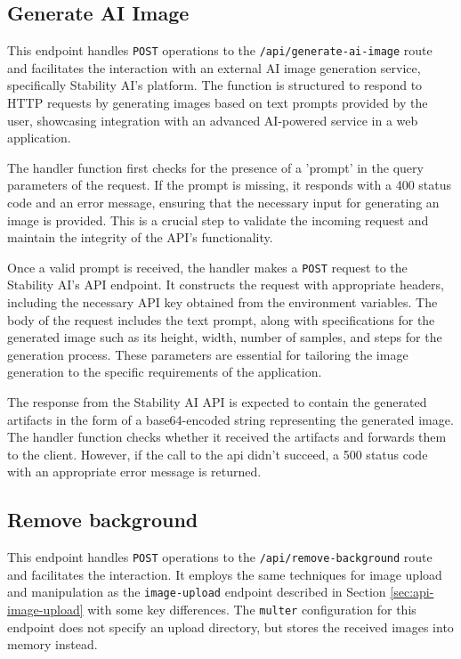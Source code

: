 \subsection{Generate AI Image}

This endpoint handles \texttt{POST} operations to the \texttt{/api/generate-ai-image} route and facilitates the interaction with an external AI image generation service, specifically Stability AI's platform. The function is structured to respond to HTTP requests by generating images based on text prompts provided by the user, showcasing integration with an advanced AI-powered service in a web application.

The handler function first checks for the presence of a 'prompt' in the query parameters of the request. If the prompt is missing, it responds with a 400 status code  and an error message, ensuring that the necessary input for generating an image is provided. This is a crucial step to validate the incoming request and maintain the integrity of the API's functionality.

Once a valid prompt is received, the handler makes a \texttt{POST} request to the Stability AI's API endpoint. It constructs the request with appropriate headers, including the necessary API key obtained from the environment variables. The body of the request includes the text prompt, along with specifications for the generated image such as its height, width, number of samples, and steps for the generation process. These parameters are essential for tailoring the image generation to the specific requirements of the application.

The response from the Stability AI API is expected to contain the generated artifacts in the form of a base64-encoded string representing the generated image. The handler function checks whether it received the artifacts and forwards them to the client. However, if the call to the \acrshort{api} didn't succeed, a 500 status code with an appropriate error message is returned.

\subsection{Remove background}

This endpoint handles \texttt{POST} operations to the \texttt{/api/remove-background} route and facilitates the interaction. It employs the same techniques for image upload and manipulation as the \texttt{image-upload} endpoint described in Section \ref{sec:api-image-upload} with some key differences. The \texttt{multer} configuration for this endpoint does not specify an upload directory, but stores the received images into memory instead.

